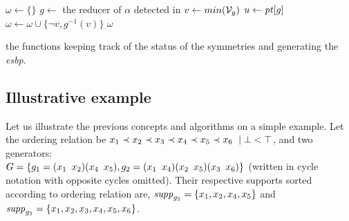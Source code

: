  \begin{algorithm}[!htbp]
  
  
  
  
  
  {
   $\omega \gets \{\}$\;
   $g \gets$ the reducer of $\alpha$ detected in \isNotMinimal\;
   $v \gets min(\mathcal{V}_g)$\;
   $u \gets \mathit{pt}[g] $\;
   $\omega \gets \omega \cup \{\neg v, g^{-1}(v)\}$\;
   \Return $\omega$
  }
  \caption{the functions keeping track of the status of the symmetries and generating the \emph{esbp}.}
  \label{algo:keep_status}
  
 \end{algorithm}%
 
 
 
 \subsection{Illustrative example}
  Let us illustrate the previous concepts and algorithms on a simple example. Let the ordering relation be $x_1 \prec x_2 \prec x_3 \prec x_4
 \prec x_5 \prec x_6\ \mid \bot < \top$, and two generators:\\
 $G = \{
  g_1 = (x_1 \enskip x_2)(x_4 \enskip x_5),g_2 = (x_1 \enskip x_4)(x_2 \enskip x_5)(x_3 \enskip x_6)\}$
 (written in cycle notation with opposite cycles omitted). Their
 respective supports sorted according to ordering relation are, $\mathit{supp}_{g_{2}} = \{x_1, x_2, x_4, x_5\}$ and
 $\mathit{supp}_{g_2} = \{x_1, x_2, x_3, x_4, x_5, x_6\}$.
 
